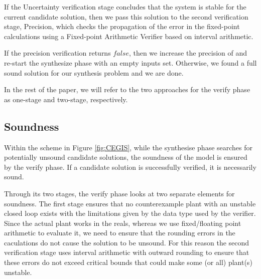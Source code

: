 \documentclass[final]{sig-alternate-05-2015}
\begin{document}
If the {\sc Uncertainty} verification stage concludes that the system is
stable for the current candidate solution, then we pass this solution to the
second verification stage, {\sc Precision}, which checks the propagation of
the error in the fixed-point calculations using a Fixed-point Arithmetic
Verifier based on interval arithmetic.
%
%

If the {\sc precision} verification returns $\mathit{false}$, then we
increase the precision of  and re-start the {\sc
  synthesize} phase with an empty {\sc inputs} set.  Otherwise, we
found a full sound solution for our synthesis problem and we are done.

In the rest of the paper, we will refer to the two approaches 
for the {\sc verify} phase as one-stage and two-stage, respectively.

\subsection{Soundness}

Within the scheme in Figure \ref{fig:CEGIS}, 
while the {\sc synthesise} phase searches for potentially unsound 
candidate solutions, the soundness of the model is ensured by the {\sc verify} phase.  
If a candidate solution is successfully verified, it is necessarily sound. 

Through its two stages, the {\sc verify} phase looks at two separate elements for
soundness.
The first stage ensures that no counterexample
plant with an unstable closed loop exists with %
the limitations given by the data
type used by the verifier. Since the actual
plant works in the reals, whereas we use fixed/floating point
arithmetic to evaluate it, we need to ensure that the rounding errors
in the caculations do not cause the solution to be unsound.
% 
For this reason the second verification stage uses interval arithmetic with
outward rounding to ensure that these errors do not exceed critical
bounds that could make some (or all) plant(s) unstable. 
\end{document}
